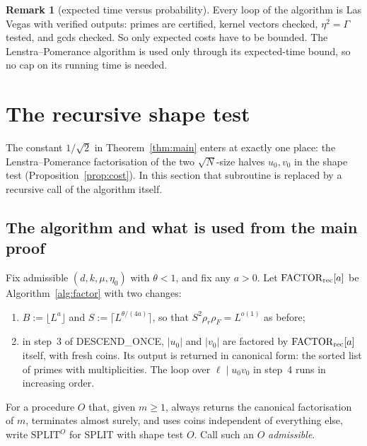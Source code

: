 \documentclass[11pt]{amsart}
\theoremstyle{definition}
\newtheorem{remark}[theorem]{Remark}
\newcommand{\rr}{\rho_r}
\newcommand{\rF}{\rho_F}
\begin{document}
\begin{remark}[expected time versus probability]
Every loop of the algorithm is Las Vegas with verified outputs: primes are certified, kernel vectors checked, $\eta^2=\Gamma$ tested, and gcds
checked. So only expected costs have to be bounded. The Lenstra--Pomerance algorithm is used only through its expected-time bound, so
no cap on its running time is needed.
\end{remark}

\section{The recursive shape test}\label{sec:recursive}

\begin{center}
\end{center}

The constant $1/\sqrt2$ in Theorem~\ref{thm:main} enters at exactly one place: the Lenstra--Pomerance factorisation of the two
$\sqrt N$-size halves $u_0,v_0$ in the shape test (Proposition~\ref{prop:cost}). In this section that subroutine is replaced by a
recursive call of the algorithm itself.

\subsection{The algorithm and what is used from the main proof}
Fix admissible $(d,k,\mu,\eta_0)$ with $\theta<1$, and fix any $a>0$. Let $\mathrm{FACTOR}_{\rm rec}[a]$ be Algorithm~\ref{alg:factor} with two
changes:
\begin{enumerate}[label=(\roman*)]
\item $B:=\lfloor L^a\rfloor$ and $S:=\lceil L^{\theta/(4a)}\rceil$, so that $S^2\rr\rF=L^{o(1)}$ as before;
\item in step~3 of DESCEND\_ONCE, $|u_0|$ and $|v_0|$ are factored by $\mathrm{FACTOR}_{\rm rec}[a]$ itself, with fresh coins. Its output is
  returned in canonical form: the sorted list of primes with multiplicities. The loop over $\ell\mid u_0v_0$ in step~4 runs in increasing order.
\end{enumerate}
For a procedure $O$ that, given $m\ge1$, always returns the canonical factorisation of $m$, terminates almost surely, and uses coins
independent of everything else, write $\mathrm{SPLIT}^O$ for SPLIT with shape test $O$. Call such an $O$ \emph{admissible}.
\end{document}
